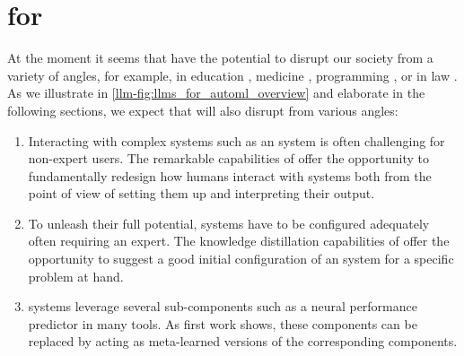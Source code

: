 

\section{\LLMs for \AutoML}
\label{llm-sec:llms-for-automl}


At the moment it seems that \LLMs have the potential to disrupt our society from a variety of angles, for example, in education \cite{kasneci-lid23a}, medicine \cite{alberts-jnmmi23a}, programming \cite{dakhel-jss23a}, or in law \cite{noonan-ssrn23}. As we illustrate in \autoref{llm-fig:llms_for_automl_overview} and elaborate in the following sections, we expect that \LLMs will also disrupt \AutoML from various angles: 

\begin{enumerate}
    \item Interacting with complex systems such as an \AutoML system is often challenging for non-expert users. The remarkable \NLP capabilities of \LLMs offer the opportunity to fundamentally redesign how humans interact with \AutoML systems both from the point of view of setting them up and interpreting their output. 
    \item To unleash their full potential, \AutoML systems have to be configured adequately often requiring an expert. The knowledge distillation capabilities of \LLMs offer the opportunity to suggest a good initial configuration of an \AutoML system for a specific problem at hand.
    \item \AutoML systems leverage several sub-components such as a neural performance predictor in many \NAS tools. As first work shows, these components can be replaced by \LLMs acting as meta-learned versions of the corresponding components.
\end{enumerate}

